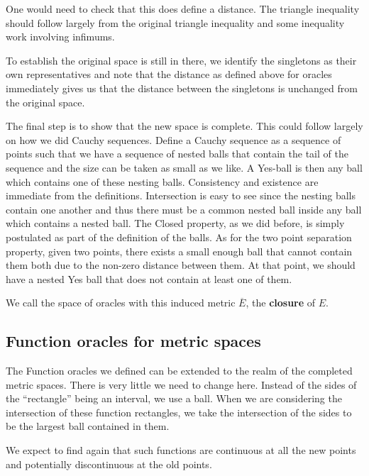 \documentclass[12pt]{article}
\theoremstyle{remark}
\begin{document}
One would need to check that this does define a distance. The triangle inequality should follow largely from the original triangle inequality and some inequality work involving infimums. 

To establish the original space is still in there, we identify the singletons as their own representatives and note that the distance as defined above for oracles immediately gives us that the distance between the singletons is unchanged from the original space. 

The final step is to show that the new space is complete. This could follow largely on how we did Cauchy sequences. Define a Cauchy sequence as a sequence of points such that we have a sequence of nested balls that contain the tail of the sequence and the size can be taken as small as we like. A Yes-ball is then any ball which contains one of these nesting balls. Consistency and existence are immediate from the definitions. Intersection is easy to see since the nesting balls contain one another and thus there must be a common nested ball inside any ball which contains a nested ball. The Closed property, as we did before, is simply postulated as part of the definition of the balls. As for the two point separation property, given two points, there exists a small enough ball that cannot contain them both due to the non-zero distance between them. At that point, we should have a nested Yes ball that does not contain at least one of them. 

We call the space of oracles with this induced metric $\overline{E}$, the \textbf{closure} of $E$.

\subsection{Function oracles for metric spaces}

The Function oracles we defined can be extended to the realm of the completed metric spaces. There is very little we need to change here. Instead of the sides of the ``rectangle'' being an interval, we use a ball. When we are considering the intersection of these function rectangles, we take the intersection of the sides to be the largest ball contained in them. 

We expect to find again that such functions are continuous at all the new points and potentially discontinuous at the old points. 
\end{document}
